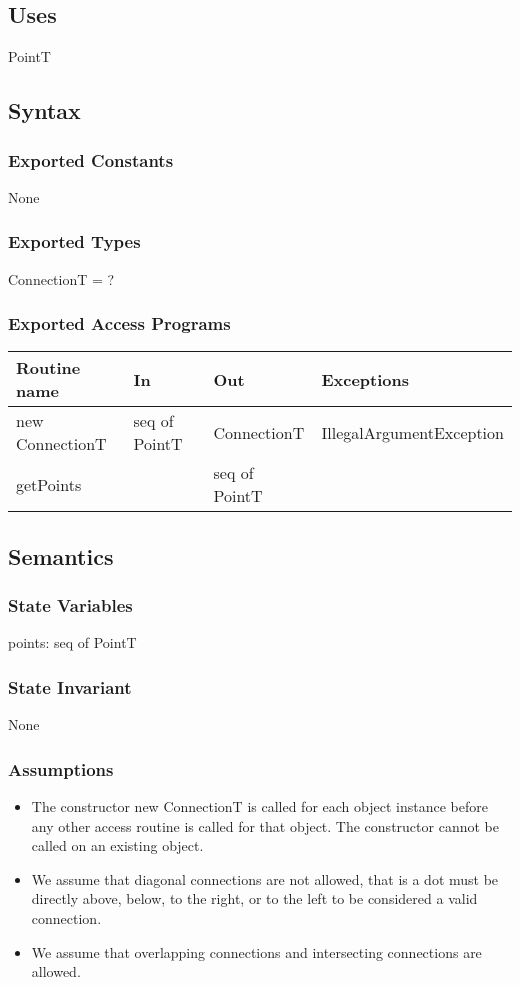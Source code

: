\documentclass[12pt]{article}
\begin{document}
\subsection* {Uses}
PointT


\subsection* {Syntax}
\subsubsection* {Exported Constants}
None

\subsubsection* {Exported Types}
ConnectionT = ?

\subsubsection* {Exported Access Programs}
\begin{tabular}{| l | l | l | l |}
\hline
\textbf{Routine name} & \textbf{In} & \textbf{Out} & \textbf{Exceptions}\\
\hline
new ConnectionT & seq of PointT & ConnectionT & IllegalArgumentException\\
\hline
getPoints & ~ & seq of PointT & ~\\
\hline
\end{tabular}


\subsection* {Semantics}
\subsubsection* {State Variables}
points: seq of PointT

\subsubsection* {State Invariant}
None

\subsubsection* {Assumptions}
\begin{itemize}
    \item The constructor new ConnectionT is called for each object instance before
    any other access routine is called for that object.  The constructor cannot
    be called on an existing object.

    \item We assume that diagonal connections are not allowed, that is a dot
    must be directly above, below, to the right, or to the left to be considered
    a valid connection.

    \item We assume that overlapping connections and intersecting connections
    are allowed.
\end{itemize}
\end{document}
